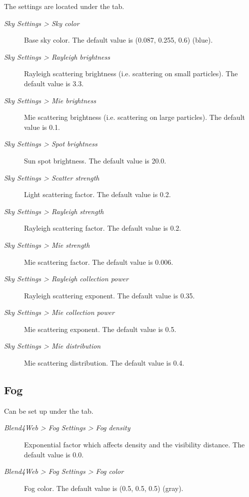 \documentclass[a4paper,12pt,oneside]{sphinxmanual}
\begin{document}
The settings are located under the  tab.
\begin{description}
\item[{\emph{Sky Settings \textgreater{} Sky color}}] \leavevmode
Base sky color. The default value is (0.087, 0.255, 0.6) (blue).

\item[{\emph{Sky Settings \textgreater{} Rayleigh brightness}}] \leavevmode
Rayleigh scattering brightness (i.e. scattering on small particles). The default value is 3.3.

\item[{\emph{Sky Settings \textgreater{} Mie brightness}}] \leavevmode
Mie scattering brightness (i.e. scattering on large particles). The default value is 0.1.

\item[{\emph{Sky Settings \textgreater{} Spot brightness}}] \leavevmode
Sun spot brightness. The default value is 20.0.

\item[{\emph{Sky Settings \textgreater{} Scatter strength}}] \leavevmode
Light scattering factor. The default value is 0.2.

\item[{\emph{Sky Settings \textgreater{} Rayleigh strength}}] \leavevmode
Rayleigh scattering factor. The default value is 0.2.

\item[{\emph{Sky Settings \textgreater{} Mie strength}}] \leavevmode
Mie scattering factor. The default value is 0.006.

\item[{\emph{Sky Settings \textgreater{} Rayleigh collection power}}] \leavevmode
Rayleigh scattering exponent. The default value is 0.35.

\item[{\emph{Sky Settings \textgreater{} Mie collection power}}] \leavevmode
Mie scattering exponent. The default value is 0.5.

\item[{\emph{Sky Settings \textgreater{} Mie distribution}}] \leavevmode
Mie scattering distribution. The default value is 0.4.

\end{description}


\subsection{Fog}
\label{outdoor_rendering:id27}
Can be set up under the  tab.
\begin{description}
\item[{\emph{Blend4Web \textgreater{} Fog Settings \textgreater{} Fog density}}] \leavevmode
Exponential factor which affects density and the visibility distance. The default value is 0.0.

\item[{\emph{Blend4Web \textgreater{} Fog Settings \textgreater{} Fog color}}] \leavevmode
Fog color. The default value is (0.5, 0.5, 0.5) (gray).

\end{description}
\end{document}
